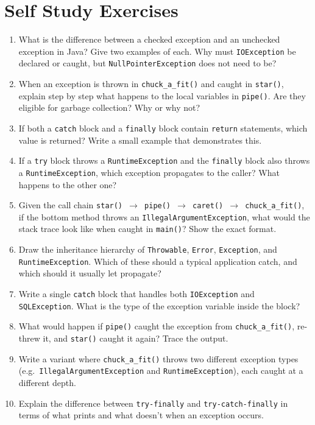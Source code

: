 \documentclass[twoside=false,DIV=14]{scrartcl}
\begin{document}
\section*{Self Study Exercises}
\begin{enumerate}
\item What is the difference between a checked exception and an unchecked exception in Java?  Give two examples of each.  Why must \texttt{IOException} be declared or caught, but \texttt{NullPointerException} does not need to be?

\item When an exception is thrown in \texttt{chuck\_a\_fit()} and caught in \texttt{star()}, explain step by step what happens to the local variables in \texttt{pipe()}.  Are they eligible for garbage collection?  Why or why not?

\item If both a \texttt{catch} block and a \texttt{finally} block contain \texttt{return} statements, which value is returned?  Write a small example that demonstrates this.

\item If a \texttt{try} block throws a \texttt{RuntimeException} and the \texttt{finally} block also throws a \texttt{RuntimeException}, which exception propagates to the caller?  What happens to the other one?

\item Given the call chain \texttt{star() $\rightarrow$ pipe() $\rightarrow$ caret() $\rightarrow$ chuck\_a\_fit()}, if the bottom method throws an \texttt{IllegalArgumentException}, what would the stack trace look like when caught in \texttt{main()}?  Show the exact format.

\item Draw the inheritance hierarchy of \texttt{Throwable}, \texttt{Error}, \texttt{Exception}, and \texttt{RuntimeException}.  Which of these should a typical application catch, and which should it usually let propagate?

\item Write a single \texttt{catch} block that handles both \texttt{IOException} and \texttt{SQLException}.  What is the type of the exception variable inside the block?

\item What would happen if \texttt{pipe()} caught the exception from \texttt{chuck\_a\_fit()}, re-threw it, and \texttt{star()} caught it again?  Trace the output.
\item Write a variant where \texttt{chuck\_a\_fit()} throws two different exception types (e.g.\ \texttt{IllegalArgumentException} and \texttt{RuntimeException}), each caught at a different depth.
\item Explain the difference between \texttt{try-finally} and \texttt{try-catch-finally} in terms of what prints and what doesn't when an exception occurs.
\end{enumerate}
\end{document}
